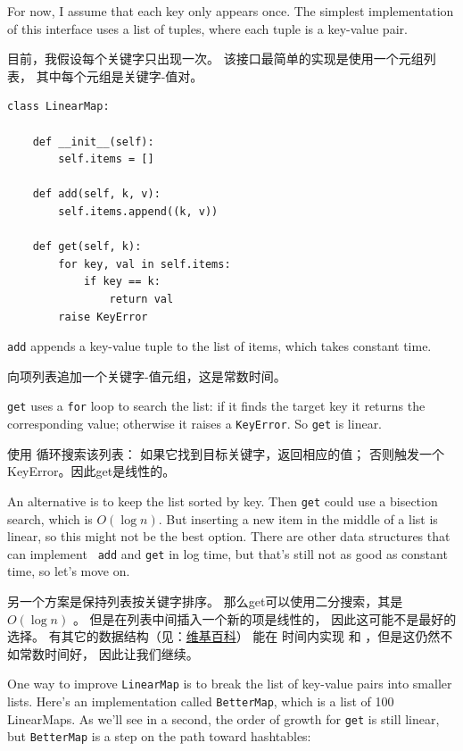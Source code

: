 For now, I assume that each key only appears once.
The simplest implementation of this interface uses a list of
tuples, where each tuple is a key-value pair.

目前，我假设每个关键字只出现一次。
该接口最简单的实现是使用一个元组列表， 其中每个元组是关键字-值对。

\begin{lstlisting}
class LinearMap:

    def __init__(self):
        self.items = []

    def add(self, k, v):
        self.items.append((k, v))

    def get(self, k):
        for key, val in self.items:
            if key == k:
                return val
        raise KeyError
\end{lstlisting}

{\tt add} appends a key-value tuple to the list of items, which
takes constant time.

 向项列表追加一个关键字-值元组，这是常数时间。

{\tt get} uses a {\tt for} loop to search the list:
if it finds the target key it returns the corresponding value;
otherwise it raises a {\tt KeyError}.
So {\tt get} is linear.

 使用  循环搜索该列表： 如果它找到目标关键字，返回相应的值；
否则触发一个KeyError。因此get是线性的。

An alternative is to keep the list sorted by key.  Then {\tt get}
could use a bisection search, which is $O(\log n)$.  But inserting a
new item in the middle of a list is linear, so this might not be the
best option.  There are other data structures that can implement {\tt
  add} and {\tt get} in log time, but that's still not as good as
constant time, so let's move on.

另一个方案是保持列表按关键字排序。
那么get可以使用二分搜索，其是 $O(\log n)$ 。
但是在列表中间插入一个新的项是线性的， 因此这可能不是最好的选择。
有其它的数据结构（见：\href{http://en.wikipedia.org/wiki/Red-black_tree}{维基百科}）
能在  时间内实现  和 ，但是这仍然不如常数时间好，
因此让我们继续。

One way to improve {\tt LinearMap} is to break the list of key-value
pairs into smaller lists.  Here's an implementation called
{\tt BetterMap}, which is a list of 100 LinearMaps.  As we'll see
in a second, the order of growth for {\tt get} is still linear,
but {\tt BetterMap} is a step on the path toward hashtables:

